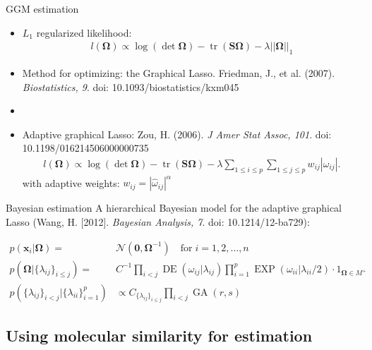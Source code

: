 \documentclass[xcolor=dvipsnames]{beamer}
\DeclareMathOperator{\tr}{tr}
\DeclareMathOperator{\DE}{DE}
\DeclareMathOperator{\EXP}{EXP}
\DeclareMathOperator{\GA}{GA}
\begin{document}
\begin{frame}{GGM estimation}
	\vspace{-15.5pt}
	\begin{itemize}
		\item $L_1$ regularized likelihood:
		\begin{align*}
		l(\boldsymbol{\Omega})\propto\log (\det \boldsymbol{\Omega})-\tr \left( \textbf{S} \boldsymbol{\Omega} \right)-\lambda ||\boldsymbol{\Omega}||_1
		\end{align*}\pause
		\item Method for optimizing: the Graphical Lasso. Friedman, J., et al. (2007). \emph{Biostatistics, 9}. doi: 10.1093/biostatistics/kxm045 \pause
		\item[]
		\item Adaptive graphical Lasso: Zou, H. (2006).  \emph{J Amer Stat Assoc, 101}. doi: 10.1198/016214506000000735 
		\begin{align*}
				l(\boldsymbol{\Omega})\propto \log(\det \boldsymbol{\Omega})-\tr \left(\mathbf{S} \boldsymbol{\Omega}\right) - \lambda \sum_{1\leq i \leq p} \sum_{1 \leq j \leq p} w_{ij} |\omega_{ij}|.
		\end{align*}
		with adaptive weights: $w_{ij}=|\hat{\omega}_{ij}|^\alpha$
	\end{itemize}
\end{frame}

\begin{frame}{Bayesian estimation}
	\vspace{-15.5pt}
	A hierarchical Bayesian model for the adaptive graphical Lasso (Wang, H. [2012]. \emph{Bayesian Analysis, 7}. doi: 10.1214/12-ba729):
	
	\begin{align*}
	p(\mathbf{x}_i|\boldsymbol{\Omega}) = & \mathcal{N}(\mathbf{0,\boldsymbol{\Omega}}^{-1}) \quad \text{for} \; i=1,2,\hdots,n\\
	p(\boldsymbol{\Omega}|\{\lambda_{ij}\}_{i\leq j}) = & C^{-1} \prod_{i<j} \DE(\omega_{ij}|\lambda_{ij}) \prod_{i=1}^{p} \EXP (\omega_{ii} | \lambda_{ii} / 2) \cdot 1_{\boldsymbol{\Omega}\in M^+}\\
	p(\{\lambda_{ij}\}_{i<j}|\{\lambda_{ii}\}_{i=1}^p) &\propto C_{\{\lambda_{ij}\}_{i\leq j}} \prod_{i<j} \GA(r,s)
	\end{align*}
\end{frame}

\subsection{Using molecular similarity for estimation}
\end{document}
